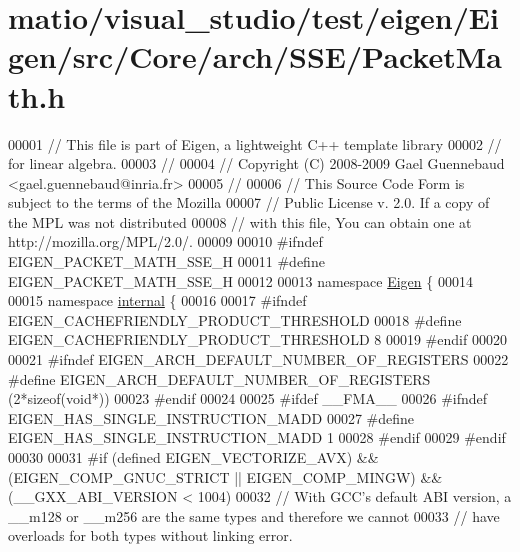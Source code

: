 \hypertarget{matio_2visual__studio_2test_2eigen_2_eigen_2src_2_core_2arch_2_s_s_e_2_packet_math_8h_source}{}\section{matio/visual\+\_\+studio/test/eigen/\+Eigen/src/\+Core/arch/\+S\+S\+E/\+Packet\+Math.h}
\label{matio_2visual__studio_2test_2eigen_2_eigen_2src_2_core_2arch_2_s_s_e_2_packet_math_8h_source}

\begin{DoxyCode}
00001 \textcolor{comment}{// This file is part of Eigen, a lightweight C++ template library}
00002 \textcolor{comment}{// for linear algebra.}
00003 \textcolor{comment}{//}
00004 \textcolor{comment}{// Copyright (C) 2008-2009 Gael Guennebaud <gael.guennebaud@inria.fr>}
00005 \textcolor{comment}{//}
00006 \textcolor{comment}{// This Source Code Form is subject to the terms of the Mozilla}
00007 \textcolor{comment}{// Public License v. 2.0. If a copy of the MPL was not distributed}
00008 \textcolor{comment}{// with this file, You can obtain one at http://mozilla.org/MPL/2.0/.}
00009 
00010 \textcolor{preprocessor}{#ifndef EIGEN\_PACKET\_MATH\_SSE\_H}
00011 \textcolor{preprocessor}{#define EIGEN\_PACKET\_MATH\_SSE\_H}
00012 
00013 \textcolor{keyword}{namespace }\hyperlink{namespace_eigen}{Eigen} \{
00014 
00015 \textcolor{keyword}{namespace }\hyperlink{namespaceinternal}{internal} \{
00016 
00017 \textcolor{preprocessor}{#ifndef EIGEN\_CACHEFRIENDLY\_PRODUCT\_THRESHOLD}
00018 \textcolor{preprocessor}{#define EIGEN\_CACHEFRIENDLY\_PRODUCT\_THRESHOLD 8}
00019 \textcolor{preprocessor}{#endif}
00020 
00021 \textcolor{preprocessor}{#ifndef EIGEN\_ARCH\_DEFAULT\_NUMBER\_OF\_REGISTERS}
00022 \textcolor{preprocessor}{#define EIGEN\_ARCH\_DEFAULT\_NUMBER\_OF\_REGISTERS (2*sizeof(void*))}
00023 \textcolor{preprocessor}{#endif}
00024 
00025 \textcolor{preprocessor}{#ifdef \_\_FMA\_\_}
00026 \textcolor{preprocessor}{#ifndef EIGEN\_HAS\_SINGLE\_INSTRUCTION\_MADD}
00027 \textcolor{preprocessor}{#define EIGEN\_HAS\_SINGLE\_INSTRUCTION\_MADD 1}
00028 \textcolor{preprocessor}{#endif}
00029 \textcolor{preprocessor}{#endif}
00030 
00031 \textcolor{preprocessor}{#if (defined EIGEN\_VECTORIZE\_AVX) && (EIGEN\_COMP\_GNUC\_STRICT || EIGEN\_COMP\_MINGW) && (\_\_GXX\_ABI\_VERSION <
       1004)}
00032 \textcolor{comment}{// With GCC's default ABI version, a \_\_m128 or \_\_m256 are the same types and therefore we cannot}
00033 \textcolor{comment}{// have overloads for both types without linking error.}

\end{DoxyCode}
